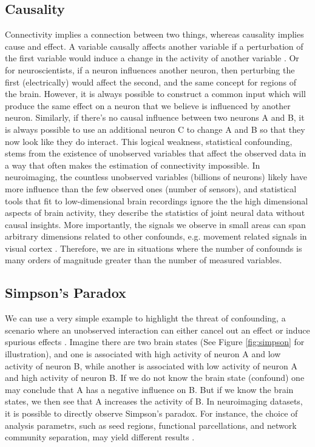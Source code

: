 \subsection{Causality}
Connectivity implies a connection between two things, whereas causality implies cause and effect. A variable causally affects another variable if a perturbation of the first variable would induce a change in the activity of another variable \cite{pearl_causality_2000}. Or for neuroscientists, if a neuron influences another neuron, then perturbing the first (electrically) would affect the second, and the same concept for regions of the brain. However, it is always possible to construct a common input which will produce the same effect on a neuron that we believe is influenced by another neuron. Similarly, if there's no causal influence between two neurons A and B, it is always possible to use an additional neuron C to change A and B so that they now look like they do interact. This logical weakness, statistical confounding, stems from the existence of unobserved variables that affect the observed data in a way that often makes the estimation of connectivity impossible. In neuroimaging, the countless unobserved variables (billions of neurons) likely have more influence than the few observed ones (number of sensors), and statistical tools that fit to low-dimensional brain recordings ignore the the high dimensional aspects of brain activity, they describe the statistics of joint neural data without causal insights. More importantly, the signals we observe in small areas can span arbitrary dimensions related to other confounds, e.g. movement related signals in visual cortex \cite{musall_movement-related_2018,stringer_spontaneous_2019}. Therefore, we are in situations where the number of confounds is many orders of magnitude greater than the number of measured variables.

\subsection{Simpson's Paradox}
We can use a very simple example to highlight the threat of confounding, a scenario where an unobserved interaction can either cancel out an effect or induce spurious effects \cite{simpson_interpretation_1951}. Imagine there are two brain states (See Figure \ref{fig:simpson} for illustration), and one is associated with high activity of neuron A and low activity of neuron B, while another is associated with low activity of neuron A and high activity of neuron B. If we do not know the brain state (confound) one may conclude that A has a negative influence on B. But if we know the brain states, we then see that A increases the activity of B. In neuroimaging datasets, it is possible to directly observe Simpson's paradox. For instance, the choice of analysis parametrs, such as seed regions, functional parcellations, and network community separation, may yield different results \cite{roberts_simpsons_2016,salehi_there_2020}.

